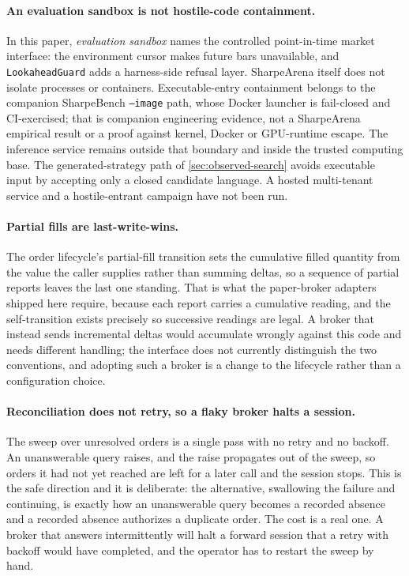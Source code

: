 \paragraph{An evaluation sandbox is not hostile-code containment.} In this paper, \emph{evaluation sandbox} names the controlled point-in-time market interface: the environment cursor makes future bars unavailable, and \texttt{LookaheadGuard} adds a harness-side refusal layer. SharpeArena itself does not isolate processes or containers. Executable-entry containment belongs to the companion SharpeBench \texttt{--image} path, whose Docker launcher is fail-closed and CI-exercised; that is companion engineering evidence, not a SharpeArena empirical result or a proof against kernel, Docker or GPU-runtime escape. The inference service remains outside that boundary and inside the trusted computing base. The generated-strategy path of \cref{sec:observed-search} avoids executable input by accepting only a closed candidate language. A hosted multi-tenant service and a hostile-entrant campaign have not been run.

\paragraph{Partial fills are last-write-wins.} The order lifecycle's partial-fill transition sets the cumulative filled quantity from the value the caller supplies rather than summing deltas, so a sequence of partial reports leaves the last one standing. That is what the paper-broker adapters shipped here require, because each report carries a cumulative reading, and the self-transition exists precisely so successive readings are legal. A broker that instead sends incremental deltas would accumulate wrongly against this code and needs different handling; the interface does not currently distinguish the two conventions, and adopting such a broker is a change to the lifecycle rather than a configuration choice.

\paragraph{Reconciliation does not retry, so a flaky broker halts a session.} The sweep over unresolved orders is a single pass with no retry and no backoff. An unanswerable query raises, and the raise propagates out of the sweep, so orders it had not yet reached are left for a later call and the session stops. This is the safe direction and it is deliberate: the alternative, swallowing the failure and continuing, is exactly how an unanswerable query becomes a recorded absence and a recorded absence authorizes a duplicate order. The cost is a real one. A broker that answers intermittently will halt a forward session that a retry with backoff would have completed, and the operator has to restart the sweep by hand.

